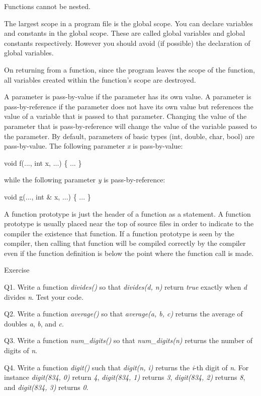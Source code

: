 \documentclass[
]{article}
\begin{document}
Functions cannot be nested.

The largest scope in a program file is the global scope. You can declare
variables and constants in the global scope. These are called global
variables and global constants respectively. However you should avoid
(if possible) the declaration of global variables.

On returning from a function, since the program leaves the scope of the
function, all variables created within the function's scope are
destroyed.

A parameter is pass-by-value if the parameter has its own value. A
parameter is pass-by-reference if the parameter does not have its own
value but references the value of a variable that is passed to that
parameter. Changing the value of the parameter that is pass-by-reference
will change the value of the variable passed to the parameter. By
default, parameters of basic types (int, double, char, bool) are
pass-by-value. The following parameter \emph{x} is pass-by-value:

void f(..., int x, ...) \{ ... \}

while the following parameter \emph{y} is pass-by-reference:

void g(..., int \& x, ...) \{ ... \}

A function prototype is just the header of a function as a statement. A
function prototype is usually placed near the top of source files in
order to indicate to the compiler the existence that function. If a
function prototype is seen by the compiler, then calling that function
will be compiled correctly by the compiler even if the function
definition is below the point where the function call is made.

Exercise

Q1. Write a function \emph{divides()} so that \emph{divides(d, n)}
return \emph{true} exactly when \emph{d} divides \emph{n}. Test your
code.

Q2. Write a function \emph{average()} so that \emph{average(a, b, c)}
returns the average of doubles \emph{a}, \emph{b}, and \emph{c}.

Q3. Write a function \emph{num\_digits()} so that \emph{num\_digits(n)}
returns the number of digits of \emph{n}.

Q4. Write a function \emph{digit()} such that \emph{digit(n, i)} returns
the \emph{i}-th digit of \emph{n}. For instance \emph{digit(834, 0)}
return \emph{4}, \emph{digit(834, 1)} returns \emph{3}, \emph{digit(834,
2)} returns \emph{8}, and \emph{digit(834, 3)} returns \emph{0}.
\end{document}
